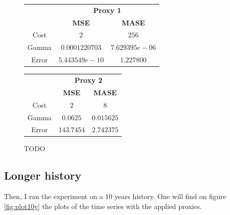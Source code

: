 \documentclass[11pt,a4paper,oneside]{book}
\begin{document}
\begin{figure}[!h]
\centering
\begin{minipage}{\textwidth}
\begin{minipage}{0.5\textwidth}
\begin{center}
\vskip10pt
   \begin{footnotesize}
   \begin{tabular}{|c|c|c|}
   \hline
   & \multicolumn{2}{|c|}{\textbf{Proxy 1}} \\ \cline{2-3}
   & \textbf{MSE} & \textbf{MASE}          \\ \hline
   Cost  & $2$            & $256$          \\ 
   Gamma & $0.0001220703$ & $7.629395e-06$ \\ 
   Error & $5.443549e-10$ & $1.227800$     \\ 
   \hline
   \end{tabular}
   \end{footnotesize}
\end{center}
\end{minipage}
\begin{minipage}{0.5\textwidth}
\begin{center}
\vskip12pt
   \begin{footnotesize}
   \begin{tabular}{|c|c|c|}
   \hline
   & \multicolumn{2}{|c|}{\textbf{Proxy 2}} \\ \cline{2-3}
   & \textbf{MSE} & \textbf{MASE}          \\ \hline
   Cost  & $2$      & $8$          \\ 
   Gamma & $0.0625$ & $0.015625$ \\ 
   Error & $143.7454$      & $2.742375$     \\ 
   \hline
   \end{tabular}
   \end{footnotesize}
\end{center}
\end{minipage}
\end{minipage}
\caption{TODO}
\label{fig:table6m}
\end{figure}




\clearpage
\subsection{Longer history}

Then, I ran the experiment on a 10 years history. One will find on figure \ref{fig:plot10y} the plots of the time series with the applied proxies.
\end{document}

